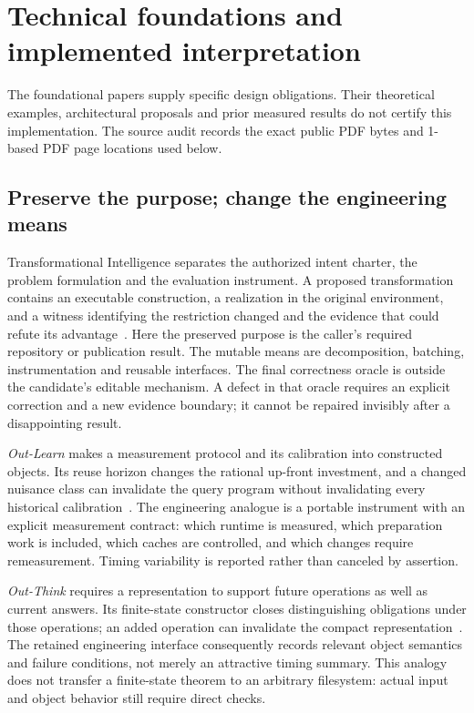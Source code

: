 \section{Technical foundations and implemented interpretation}
\label{sec:foundations}

The foundational papers supply specific design obligations. Their theoretical examples, architectural proposals and prior measured results do not certify this implementation. The source audit records the exact public PDF bytes and 1-based PDF page locations used below.

\subsection{Preserve the purpose; change the engineering means}

Transformational Intelligence separates the authorized intent charter, the problem formulation and the evaluation instrument. A proposed transformation contains an executable construction, a realization in the original environment, and a witness identifying the restriction changed and the evidence that could refute its advantage~\cite[PDF pp.~3, 7--8]{transformational_intelligence}. Here the preserved purpose is the caller's required repository or publication result. The mutable means are decomposition, batching, instrumentation and reusable interfaces. The final correctness oracle is outside the candidate's editable mechanism. A defect in that oracle requires an explicit correction and a new evidence boundary; it cannot be repaired invisibly after a disappointing result.

\emph{Out-Learn} makes a measurement protocol and its calibration into constructed objects. Its reuse horizon changes the rational up-front investment, and a changed nuisance class can invalidate the query program without invalidating every historical calibration~\cite[PDF pp.~7, 12--14]{out_learn}. The engineering analogue is a portable instrument with an explicit measurement contract: which runtime is measured, which preparation work is included, which caches are controlled, and which changes require remeasurement. Timing variability is reported rather than canceled by assertion.

\emph{Out-Think} requires a representation to support future operations as well as current answers. Its finite-state constructor closes distinguishing obligations under those operations; an added operation can invalidate the compact representation~\cite[PDF pp.~4, 12--13]{out_think}. The retained engineering interface consequently records relevant object semantics and failure conditions, not merely an attractive timing summary. This analogy does not transfer a finite-state theorem to an arbitrary filesystem: actual input and object behavior still require direct checks.

